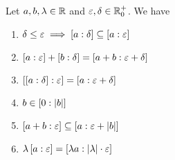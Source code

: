 \begin{theorem}
  Let $a,b,\lambda\in\R$ and $\epsilon,\delta\in\Rplusnull$. We have

  \begin{enumerate}
    \item $\delta \le \epsilon \implies \an[\delta]{a} \subseteq \an[\epsilon]{a}$
    \item $\an[\epsilon]{a}+\an[\delta]{b}=\an[\epsilon+\delta]{a+b}$
    \item $\an[\epsilon]{\an[\delta]{a}} = \an[\epsilon+\delta]{a}$
    \item $b \in \an[|b|]{0}$
    \item $\an[\epsilon]{a+b} \subseteq \an[\epsilon+\abs{b}]{a}$
    \item $\lambda \an[\epsilon]{a} = \an[\abs{\lambda}\cdot \epsilon]{\lambda a}$
  \end{enumerate}
\end{theorem}
